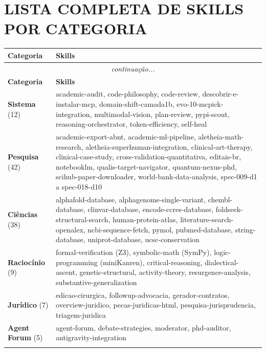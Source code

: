 \chapter{LISTA COMPLETA DE SKILLS POR CATEGORIA}
\label{ap:skills}

\begin{longtable}{p{4cm}p{11cm}}
\toprule
\textbf{Categoria} & \textbf{Skills} \\
\midrule
\endfirsthead
\multicolumn{2}{c}{\textit{continuação...}} \\
\toprule
\textbf{Categoria} & \textbf{Skills} \\
\midrule
\endhead
\bottomrule
\endfoot

\textbf{Sistema} (12) & 
academic-audit, code-philosophy, code-review, descobrir-e-instalar-mcp, domain-shift-camada1b, evo-10-mcpick-integration, multimodal-vision, plan-review, pypi-scout, reasoning-orchestrator, token-efficiency, self-heal \\
\addlinespace

\textbf{Pesquisa} (42) & 
academic-export-abnt, academic-ml-pipeline, aletheia-math-research, aletheia-superhuman-integration, clinical-art-therapy, clinical-case-study, cross-validation-quantitativa, editais-br, notebooklm, qualis-target-navigator, quantum-nexus-phd, scihub-paper-downloader, world-bank-data-analysis, spec-009-d1 a spec-018-d10 \\
\addlinespace

\textbf{Ciências} (38) & 
alphafold-database, alphagenome-single-variant, chembl-database, clinvar-database, encode-ccres-database, foldseek-structural-search, human-protein-atlas, literature-search-openalex, ncbi-sequence-fetch, pymol, pubmed-database, string-database, uniprot-database, ucsc-conservation \\
\addlinespace

\textbf{Raciocínio} (9) & 
formal-verification (Z3), symbolic-math (SymPy), logic-programming (miniKanren), critical-reasoning, dialectical-ascent, genetic-structural, activity-theory, resurgence-analysis, substantive-generalization \\
\addlinespace

\textbf{Jurídico} (7) & 
edicao-cirurgica, followup-advocacia, gerador-contratos, overview-juridico, pecas-juridicas-html, pesquisa-jurisprudencia, triagem-juridica \\
\addlinespace

\textbf{Agent Forum} (5) & 
agent-forum, debate-strategies, moderator, phd-auditor, antigravity-integration \\
\addlinespace


\end{longtable}
